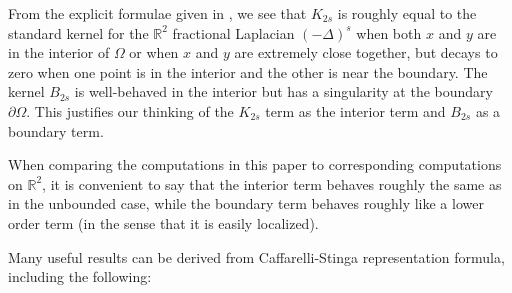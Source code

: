 \documentclass[11pt]{amsart}
\theoremstyle{remark}
\theoremstyle{definition}
\newcommand{\R}{\mathbb{R}}
\newcommand{\del}{\partial}
\newcommand{\Laplace}{\Delta}
\begin{document}
From the explicit formulae given in \cite{CaSt}, we see that $K_{2s}$ is roughly equal to the standard kernel for the $\R^2$ fractional Laplacian $(-\Laplace)^s$ when both $x$ and $y$ are in the interior of $\Omega$ or when $x$ and $y$ are extremely close together, but decays to zero when one point is in the interior and the other is near the boundary.  The kernel $B_{2s}$ is well-behaved in the interior but has a singularity at the boundary $\del \Omega$.  This justifies our thinking of the $K_{2s}$ term as the interior term and $B_{2s}$ as a boundary term.  

When comparing the computations in this paper to corresponding computations on $\R^2$, it is convenient to say that the interior term behaves roughly the same as in the unbounded case, while the boundary term behaves roughly like a lower order term (in the sense that it is easily localized).  

Many useful results can be derived from Caffarelli-Stinga representation formula, including the following:
\end{document}
